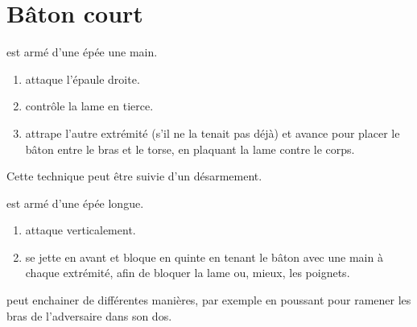 \chapter{Bâton court}


\begin{technique}

\A est armé d'une épée une main.

\begin{enumerate}
	\item \A attaque l'épaule droite.
	
	\item \D contrôle la lame en tierce.
	
	\item \D attrape l'autre extrémité (s'il ne la tenait pas déjà) et avance pour placer le bâton entre le bras et le torse, en plaquant la lame contre le corps.
\end{enumerate}

Cette technique peut être suivie d'un désarmement.
\end{technique}


\begin{technique}

\A est armé d'une épée longue.

\begin{enumerate}
	\item \A attaque verticalement.
	
	\item \D se jette en avant et bloque en quinte en tenant le bâton avec une main à chaque extrémité, afin de bloquer la lame ou, mieux, les poignets.
\end{enumerate}

\D peut enchainer de différentes manières, par exemple en poussant pour ramener les bras de l'adversaire dans son dos.
\end{technique}

